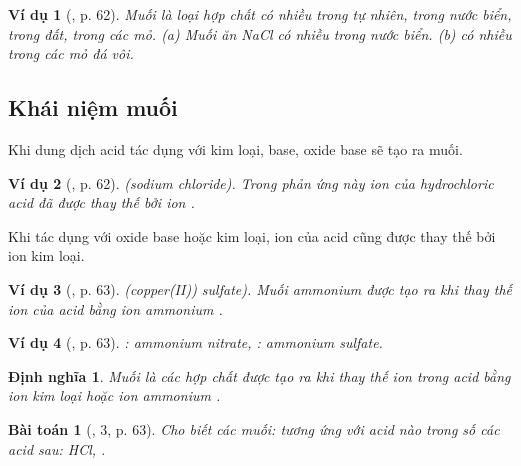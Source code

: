 \documentclass{article}
\newtheorem{baitoan}{Bài toán}
\newtheorem{dinhnghia}{Định nghĩa}
\newtheorem{vidu}{Ví dụ}
\begin{document}
\begin{vidu}[\cite{SGK_KHTN_8_Canh_Dieu}, p. 62]
	Muối là loại hợp chất có nhiều trong tự nhiên, trong nước biển, trong đất, trong các mỏ. (a) Muối ăn \emph{NaCl} có nhiều trong nước biển. (b) \emph{} có nhiều trong các mỏ đá vôi.
\end{vidu}

\subsection{Khái niệm muối}
Khi dung dịch acid tác dụng với kim loại, base, oxide base sẽ tạo ra muối.

\begin{vidu}[\cite{SGK_KHTN_8_Canh_Dieu}, p. 62]
	\emph{} (sodium chloride). Trong phản ứng này ion \emph{} của hydrochloric acid đã được thay thế bởi ion \emph{}.
\end{vidu}
Khi tác dụng với oxide base hoặc kim loại, ion  của acid cũng được thay thế bởi ion kim loại.

\begin{vidu}[\cite{SGK_KHTN_8_Canh_Dieu}, p. 63]
	\emph{} (copper(II)) sulfate). Muối ammonium được tạo ra khi thay thế ion \emph{} của acid bằng ion ammonium \emph{}.
\end{vidu}

\begin{vidu}[\cite{SGK_KHTN_8_Canh_Dieu}, p. 63]
	\emph{}: ammonium nitrate, \emph{}: ammonium sulfate.
\end{vidu}

\begin{dinhnghia}
	\emph{Muối} là các hợp chất được tạo ra khi thay thế ion \emph{} trong acid bằng ion kim loại hoặc ion ammonium \emph{}.
\end{dinhnghia}

\begin{baitoan}[\cite{SGK_KHTN_8_Canh_Dieu}, 3, p. 63]
	Cho biết các muối: \emph{} tương ứng với acid nào trong số các acid sau: \emph{HCl, }.
\end{baitoan}
\end{document}

